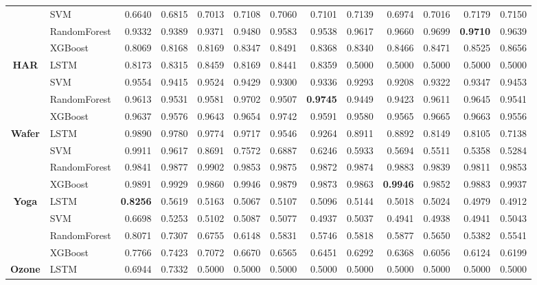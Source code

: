 \begin{table}[h]
\begin{adjustbox}{max width=15cm}
\begin{tabular}{|c|l|r|r|r|r|r|r|r|r|r|r|r|}
	& SVM &  0.6640 &  0.6815 &  0.7013 &  0.7108 &  0.7060 &  0.7101 &  0.7139 &  0.6974 &  0.7016 &  0.7179 &  0.7150 \\
	& RandomForest &  0.9332 &  0.9389 &  0.9371 &  0.9480 &  0.9583 &  0.9538 &  0.9617 &  0.9660 &  0.9699 &  \textbf{0.9710} &  0.9639 \\
	& XGBoost &  0.8069 &  0.8168 &  0.8169 &  0.8347 &  0.8491 &  0.8368 &  0.8340 &  0.8466 &  0.8471 &  0.8525 &  0.8656 \\
	\hline
	\textbf{HAR} & LSTM &  0.8173 &  0.8315 &  0.8459 &  0.8169 &  0.8441 &  0.8359 &  0.5000 &  0.5000 &  0.5000 &  0.5000 &  0.5000 \\
	& SVM &  0.9554 &  0.9415 &  0.9524 &  0.9429 &  0.9300 &  0.9336 &  0.9293 &  0.9208 &  0.9322 &  0.9347 &  0.9453 \\
	& RandomForest &  0.9613 &  0.9531 &  0.9581 &  0.9702 &  0.9507 &  \textbf{0.9745} &  0.9449 &  0.9423 &  0.9611 &  0.9645 &  0.9541 \\
	& XGBoost &  0.9637 &  0.9576 &  0.9643 &  0.9654 &  0.9742 &  0.9591 &  0.9580 &  0.9565 &  0.9665 &  0.9663 &  0.9556 \\
	\hline
	\textbf{Wafer} & LSTM &  0.9890 &  0.9780 &  0.9774 &  0.9717 &  0.9546 &  0.9264 &  0.8911 &  0.8892 &  0.8149 &  0.8105 &  0.7138 \\
	& SVM &  0.9911 &  0.9617 &  0.8691 &  0.7572 &  0.6887 &  0.6246 &  0.5933 &  0.5694 &  0.5511 &  0.5358 &  0.5284 \\
	& RandomForest &  0.9841 &  0.9877 &  0.9902 &  0.9853 &  0.9875 &  0.9872 &  0.9874 &  0.9883 &  0.9839 &  0.9811 &  0.9853 \\
	& XGBoost &  0.9891 &  0.9929 &  0.9860 &  0.9946 &  0.9879 &  0.9873 &  0.9863 &  \textbf{0.9946} &  0.9852 &  0.9883 &  0.9937 \\
	\hline
	\textbf{Yoga} & LSTM &  \textbf{0.8256} &  0.5619 &  0.5163 &  0.5067 &  0.5107 &  0.5096 &  0.5144 &  0.5018 &  0.5024 &  0.4979 &  0.4912 \\
	& SVM &  0.6698 &  0.5253 &  0.5102 &  0.5087 &  0.5077 &  0.4937 &  0.5037 &  0.4941 &  0.4938 &  0.4941 &  0.5043 \\
	& RandomForest &  0.8071 &  0.7307 &  0.6755 &  0.6148 &  0.5831 &  0.5746 &  0.5818 &  0.5877 &  0.5650 &  0.5382 &  0.5541 \\
	& XGBoost &  0.7766 &  0.7423 &  0.7072 &  0.6670 &  0.6565 &  0.6451 &  0.6292 &  0.6368 &  0.6056 &  0.6124 &  0.6199 \\
	\hline
	\textbf{Ozone} & LSTM &  0.6944 &  0.7332 &  0.5000 &  0.5000 &  0.5000 &  0.5000 &  0.5000 &  0.5000 &  0.5000 &  0.5000 &  0.5000 \\

\end{tabular}
\end{adjustbox}
\end{table}
